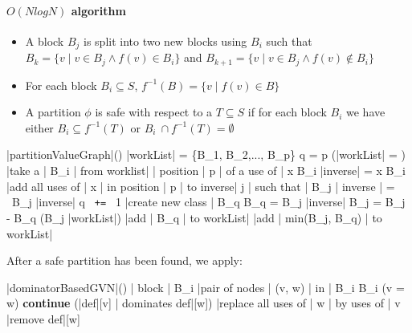 \documentclass[a4paper,12pt, notitlepage]{article}
\newcommand{\negv}{\vspace{-0.7cm}}
\begin{document}
\paragraph*{$O(N log N)$ algorithm}
\begin{itemize}
\item A block $B_j$ is split into two new blocks using $B_i$ such that\\
$B_k = \{v \mid v \in B_j \land f(v) \in B_i\}$ and $B_{k+1} = \{v \mid v \in
B_j \land f(v) \not\in B_i\}$
\item For each block $B_i \subseteq S$, $f^{-1}(B) = \{v \mid f(v) \in B\}$
\item A partition $\phi$ is safe with respect to a $T \subseteq S$ if for each
block $B_i$ we have either $B_i \subseteq f^{-1}(T)$ or $B_i \ \cap f^{-1}(T) =
\emptyset$
\end{itemize}
\negv
\begin{program}
\PROC |partitionValueGraph|() \BODY
    |workList| = \{B_1, B_2,..., B_p\}
    q = p
    \WHILE (|workList| \not= \emptyset) \DO
        |take a | B_i | from worklist|
        \FOREACH | position | p | of a use of | x \in B_i \DO
            |inverse| = \emptyset
            \FOREACH x \in B_i \DO
                |add all uses of | x | in position | p | to inverse|
            \OD
            \FOREACH j | such that | B_j \cap | inverse | \not= \emptyset \land \ B_j \not\subseteq |inverse| \DO
                     q \texttt{ += } 1
                     |create new class | B_q
                     B_q = B_j \cap |inverse|
                     B_j = B_j - B_q
                     \IF (B_j \in |workList|)
                        |add | B_q | to workList|
                    \ELSE
                        |add | min(B_j, B_q) | to workList|
                    \FI
            \OD
        \OD
    \OD
\end{program}

After a safe partition has been found, we apply:
\begin{program}
\PROC |dominatorBasedGVN|() \BODY
    \FOREACH | block | B_i \in \pi \DO
        \FOREACH |pair of nodes | (v, w) | in | B_i \times B_i \DO
            \IF (v = w) \textbf{ continue} \FI
            \IF (|def|[v] | dominates def|[w]) \AR*
                |replace all uses of | w | by uses of | v
                |remove def|[w]
            \FI
        \OD
    \OD
\end{program}
\end{document}
